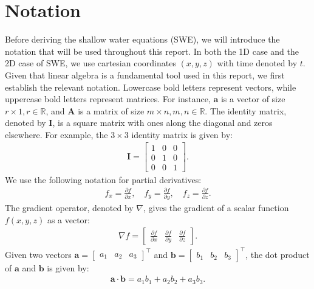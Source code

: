 \section{Notation}
Before deriving the shallow water equations (SWE), we will introduce the notation that will be used throughout this report.
In both the 1D case and the 2D case of SWE, we use cartesian coordinates $(x, y, z)$ with time denoted by $t$.
Given that linear algebra is a fundamental tool used in this report, we first establish the relevant notation.
Lowercase bold letters represent vectors, while uppercase bold letters represent matrices.
For instance, $\mathbf{a}$ is a vector of size $r \times 1, r \in \mathbb{R}$, and $\mathbf{A}$ is a matrix of size $m \times n, m,n \in \mathbb{R}$.
The identity matrix, denoted by $\mathbf{I}$, is a square matrix with ones along the diagonal and zeros elsewhere.
For example, the $3 \times 3$ identity matrix is given by:
\begin{align*}
    \mathbf{I} = \begin{bmatrix}
        1 & 0 & 0 \\
        0 & 1 & 0 \\
        0 & 0 & 1
    \end{bmatrix}.
\end{align*}
We use the following notation for partial derivatives:
\begin{align}\label{eq:notation_partial_derivatives}
   f_x =  \frac{\partial f}{\partial x}, \quad f_y = \frac{\partial f}{\partial y}, \quad f_z = \frac{\partial f}{\partial z}.
\end{align}
The gradient operator, denoted by $\nabla$, gives the gradient of a scalar function $f(x,y,z)$ as a vector:
\begin{align*}
    \nabla f = \begin{bmatrix}
        \frac{\partial f}{\partial x} &
        \frac{\partial f}{\partial y} &
        \frac{\partial f}{\partial z}
    \end{bmatrix}.
\end{align*}
Given two vectors $\mathbf{a} = \begin{bmatrix}
    a_1 & a_2 & a_3
\end{bmatrix}^\top $ and $\mathbf{b} = \begin{bmatrix}
    b_1 & b_2 & b_3
\end{bmatrix}^\top$, the dot product of $\mathbf{a}$ and $\mathbf{b}$ is given by:
\begin{align*}
    \mathbf{a} \cdot \mathbf{b} = a_1 b_1 + a_2 b_2 + a_3 b_3.
\end{align*}
